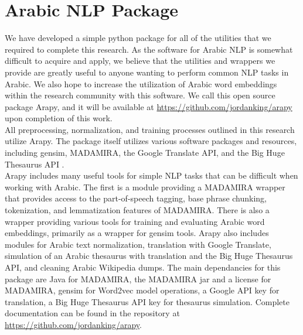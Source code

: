 \section{Arabic NLP Package}
\label{sec:arapy}

We have developed a simple python package for all of the utilities that we required to complete this research. As the software for Arabic NLP is somewhat difficult to acquire and apply, we believe that the utilities and wrappers we provide are greatly useful to anyone wanting to perform common NLP tasks in Arabic. We also hope to increase the utilization of Arabic word embeddings within the research community with this software. We call this open source package Arapy, and it will be available at \url{https://github.com/jordanking/arapy} upon completion of this work. 
\\
All preprocessing, normalization, and training processes outlined in this research utilize Arapy. The package itself utilizes various software packages and resources, including gensim, MADAMIRA, the Google Translate API, and the Big Huge Thesaurus API \cite{rehurek_lrec,pasha:2014,google:online,bhl:online}.
\\
Arapy includes many useful tools for simple NLP tasks that can be difficult when working with Arabic. The first is a module providing a MADAMIRA wrapper that provides access to the part-of-speech tagging, base phrase chunking, tokenization, and lemmatization features of MADAMIRA. There is also a wrapper providing various tools for training and evaluating Arabic word embeddings, primarily as a wrapper for gensim tools. Arapy also includes modules for Arabic text normalization, translation with Google Translate, simulation of an Arabic thesaurus with translation and the Big Huge Thesaurus API, and cleaning Arabic Wikipedia dumps. The main dependancies for this package are Java for MADAMIRA, the MADAMIRA jar and a license for MADAMIRA, gensim for Word2vec model operations, a Google API key for translation, a Big Huge Thesaurus API key for thesaurus simulation. Complete documentation can be found in the repository at \url{https://github.com/jordanking/arapy}.
